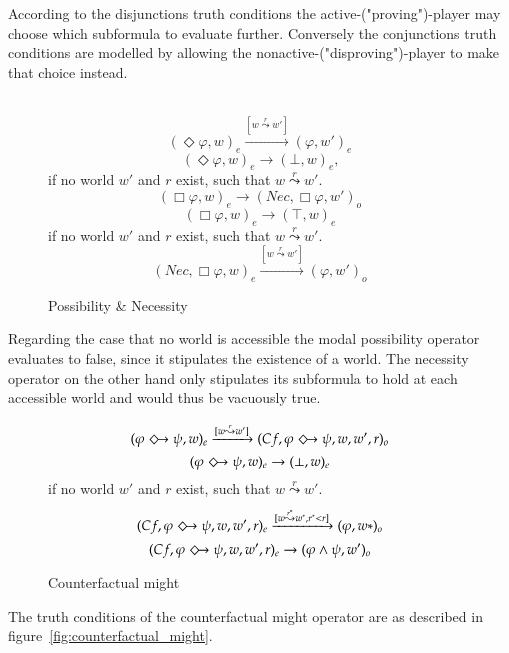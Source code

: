 \documentclass[a4paper,american]{paper}
\begin{document}
	According to the disjunctions truth conditions the active-("proving")-player may choose which subformula to evaluate further. Conversely the conjunctions truth conditions are modelled by allowing the nonactive-("disproving")-player to make that choice instead. \\\\
	
\begin{figure}[H]
	\centering
	\begin{equation}
		(\Diamond\varphi ,w)_e\xrightarrow{[w\overset{r}{\leadsto}w']} (\varphi ,w')_{e}
	\end{equation}
	\begin{equation}
		(\Diamond\varphi ,w)_e\rightarrow (\bot ,w)_{e}\text{,}
	\end{equation}
	if no world $w'$ and $r$ exist, such that $w\overset{r}{\leadsto}w'$.
	\begin{equation}
		(\Box\varphi ,w)_e\rightarrow (Nec,\Box\varphi ,w')_{o}
	\end{equation}
	\begin{equation}
		(\Box\varphi ,w)_e\rightarrow (\top ,w)_{e}
	\end{equation}
	if no world $w'$ and $r$ exist, such that $w\overset{r}{\leadsto}w'$.
	\begin{equation}
		(Nec, \Box\varphi ,w)_e\xrightarrow{[w\overset{r}{\leadsto}w']} (\varphi ,w')_{o}
	\end{equation}
	\caption{Possibility \& Necessity}
	\label{fig:modal_operator_rules}
\end{figure}

	Regarding the case that no world is accessible the modal possibility operator evaluates to false, since it stipulates the existence of a world. The necessity operator on the other hand only stipulates its subformula to hold at each accessible world and would thus be vacuously true.
\begin{figure}[H]
	\centering
	\begin{equation}
		(\varphi\Diamondright\psi ,w)_e\xrightarrow{[w\overset{r}{\leadsto}w']} (Cf,\varphi\Diamondright\psi ,w,w',r)_o
	\end{equation}
	\begin{equation}
		(\varphi\Diamondright\psi ,w)_e\rightarrow (\bot ,w)_e
	\end{equation}
	if no world $w'$ and $r$ exist, such that $w\overset{r}{\leadsto}w'$.
	\begin{equation}
		(Cf,\varphi\Diamondright\psi ,w,w',r)_e\xrightarrow{[w\overset{r^*}{\leadsto}w^*,r^*< r]} (\varphi ,w*)_o
	\end{equation}
	\begin{equation}
		(Cf,\varphi\Diamondright\psi ,w,w',r)_e\rightarrow (\varphi\wedge\psi ,w')_o
	\end{equation}
	\caption{Counterfactual might}
	\label{fig:counterfactual_might_rules}
\end{figure}
	The truth conditions of the counterfactual might operator are as described in figure~\ref{fig:counterfactual_might}.
	
\end{document}
